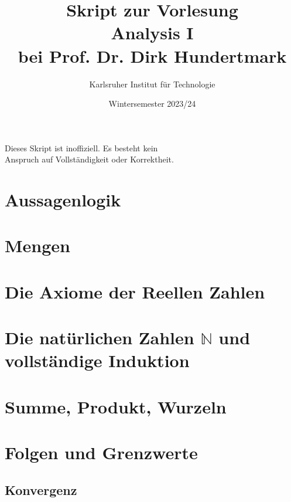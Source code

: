 \documentclass[11pt, twoside, a4paper]{article}
\theoremstyle{plain}
\newcommand{\naturalnumbers}{\mathbb{N}}
\begin{document}
    \title{\vspace{3cm} Skript zur Vorlesung\\Analysis I\\bei Prof. Dr. Dirk Hundertmark}
    \author{Karlsruher Institut für Technologie}
    \date{Wintersemester 2023/24}
    \maketitle
    \begin{center}
        Dieses Skript ist inoffiziell. Es besteht kein\\ Anspruch auf Vollständigkeit oder Korrektheit.
    \end{center}
    \thispagestyle{empty}
    \newpage

    \tableofcontents
    \newpage


    \section{Aussagenlogik}
    


    \section{Mengen}
    


    \section{Die Axiome der Reellen Zahlen}
    


    \section{Die natürlichen Zahlen $\naturalnumbers$ und vollständige Induktion}
    


    \section{Summe, Produkt, Wurzeln}
    


    \section{Folgen und Grenzwerte}

    \subsection{Konvergenz}
    \thispagestyle{pagenumberonly}
\end{document}
